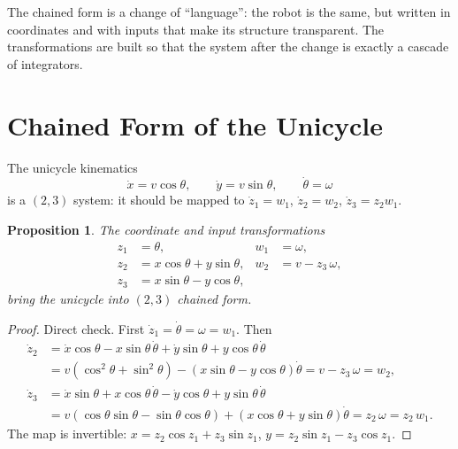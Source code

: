 \documentclass[11pt,a4paper]{article}
\theoremstyle{definition}
\theoremstyle{plain}
\newtheorem{proposition}[definition]{Proposition}
\begin{document}
\begin{intuition}
The chained form is a change of ``language'': the robot is the same, but written in coordinates and with inputs that make its structure transparent. The transformations are built so that the system after the change is exactly a cascade of integrators.
\end{intuition}

\section{Chained Form of the Unicycle}

The unicycle kinematics
\[
 \dot x=v\cos\theta,\qquad \dot y=v\sin\theta,\qquad\dot\theta=\omega
\]
is a $(2,3)$ system: it should be mapped to $\dot z_1=w_1$, $\dot z_2=w_2$, $\dot z_3=z_2w_1$.

\begin{proposition}\label{prop:unicycle}
The coordinate and input transformations
\begin{align*}
 z_1&=\theta, & w_1&=\omega,\\
 z_2&=x\cos\theta+y\sin\theta, & w_2&=v-z_3\,\omega,\\
 z_3&=x\sin\theta-y\cos\theta,
\end{align*}
bring the unicycle into $(2,3)$ chained form.
\end{proposition}
\begin{proof}
Direct check. First $\dot z_1=\dot\theta=\omega=w_1$. Then
\begin{align*}
 \dot z_2&=\dot x\cos\theta-x\sin\theta\,\dot\theta+\dot y\sin\theta+y\cos\theta\,\dot\theta\\
 &=v(\cos^2\theta+\sin^2\theta)-(x\sin\theta-y\cos\theta)\dot\theta=v-z_3\,\omega=w_2,\\
 \dot z_3&=\dot x\sin\theta+x\cos\theta\,\dot\theta-\dot y\cos\theta+y\sin\theta\,\dot\theta\\
 &=v(\cos\theta\sin\theta-\sin\theta\cos\theta)+(x\cos\theta+y\sin\theta)\dot\theta=z_2\,\omega=z_2\,w_1 .
\end{align*}
The map is invertible: $x=z_2\cos z_1+z_3\sin z_1$, $y=z_2\sin z_1-z_3\cos z_1$.
\end{proof}
\end{document}
